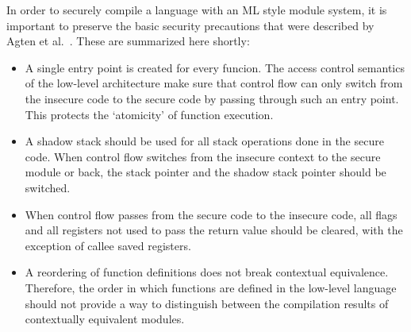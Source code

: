 \documentclass[11pt]{article}
\begin{document}
In order to securely compile a language with an ML style module system, it is important to preserve the basic security precautions that were described by Agten et al.~\cite{Agten:2012:SCM:2354412.2355247}. These are summarized here shortly:

\begin{itemize}
\item A single entry point is created for every funcion.
The access control semantics of the low-level architecture make sure that control flow can only switch from the insecure code to the secure code by passing through such an entry point.
This protects the `atomicity' of function execution.
\item A shadow stack should be used for all stack operations done in the secure code. When control flow switches from the insecure context to the secure module or back, the stack pointer and the shadow stack pointer should be switched.
\item When control flow passes from the secure code to the insecure code, all flags and all registers not used to pass the return value should be cleared, with the exception of callee saved registers.
\item A reordering of function definitions does not break contextual equivalence. Therefore, the order in which functions are defined in the low-level language should not provide a way to distinguish between the compilation results of contextually equivalent modules.
\end{itemize}
\end{document}

